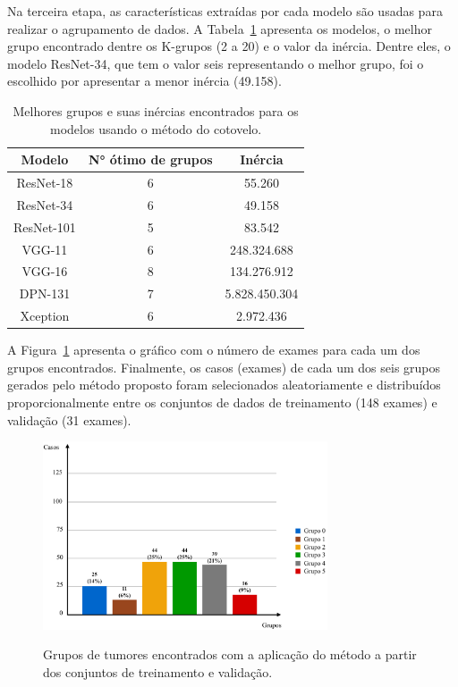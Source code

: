 Na terceira etapa, as características extraídas por cada modelo são usadas para realizar o agrupamento de dados. A Tabela~\ref{tab:melhores-grupos} apresenta os modelos, o melhor grupo encontrado dentre os K-grupos (2 a 20) e o valor da inércia. Dentre eles, o modelo ResNet-34, que tem o valor seis representando o melhor grupo, foi o escolhido por apresentar a menor inércia (49.158).

\begin{table}[!ht]
\caption{Melhores grupos e suas inércias encontrados para os modelos usando o método do cotovelo.}
\label{tab:melhores-grupos}
\centering
\begin{tabular}{c|c|c}
\hline
Modelo     & N° ótimo de grupos & Inércia       \\ \hline
ResNet-18  & 6                  & 55.260        \\ \hline
\rowcolor[HTML]{C0C0C0} 
ResNet-34  & 6                  & 49.158        \\ \hline
ResNet-101 & 5                  & 83.542        \\ \hline
VGG-11     & 6                  & 248.324.688   \\ \hline
VGG-16     & 8                  & 134.276.912   \\ \hline
DPN-131    & 7                  & 5.828.450.304 \\ \hline
Xception   & 6                  & 2.972.436     \\ \hline
\end{tabular}
\end{table}

A Figura~\ref{fig:distribuicao-proporcional} apresenta o gráfico com o número de exames para cada um dos grupos encontrados. Finalmente, os casos (exames) de cada um dos seis grupos gerados pelo método proposto foram selecionados aleatoriamente e distribuídos proporcionalmente entre os conjuntos de dados de treinamento (148 exames) e validação (31 exames).

\begin{figure}[!ht]
    \centering
    \caption{Grupos de tumores encontrados com a aplicação do método a partir dos conjuntos de treinamento e validação.}
    \includegraphics[width=0.75\textwidth]{figuras/distribuicao-proporcional.pdf}
    \label{fig:distribuicao-proporcional}
\end{figure}

